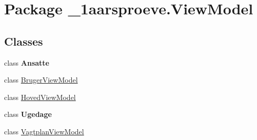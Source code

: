 \hypertarget{namespace__1aarsproeve_1_1_view_model}{}\section{Package \+\_\+1aarsproeve.\+View\+Model}
\label{namespace__1aarsproeve_1_1_view_model}
\subsection*{Classes}
\begin{DoxyCompactItemize}
\item 
class {\bfseries Ansatte}
\item 
class \hyperlink{class__1aarsproeve_1_1_view_model_1_1_bruger_view_model}{Bruger\+View\+Model}
\item 
class \hyperlink{class__1aarsproeve_1_1_view_model_1_1_hoved_view_model}{Hoved\+View\+Model}
\item 
class {\bfseries Ugedage}
\item 
class \hyperlink{class__1aarsproeve_1_1_view_model_1_1_vagtplan_view_model}{Vagtplan\+View\+Model}
\end{DoxyCompactItemize}
